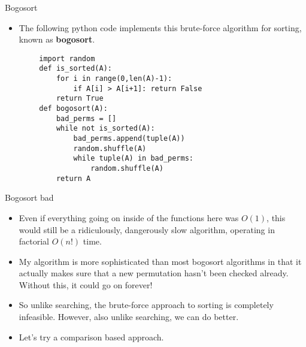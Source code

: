 \documentclass{beamer}
\begin{document}
\begin{frame}[fragile]{Bogosort}
    \begin{itemize}
        \item The following python code implements this brute-force algorithm for sorting, known as \textbf{bogosort}. 
    \end{itemize}
    \begin{verbatim}
        import random
        def is_sorted(A):
	        for i in range(0,len(A)-1):
		        if A[i] > A[i+1]: return False
	        return True
        def bogosort(A):
	        bad_perms = []
	        while not is_sorted(A):
		        bad_perms.append(tuple(A))
		        random.shuffle(A)
		        while tuple(A) in bad_perms:
			        random.shuffle(A)
	        return A
    \end{verbatim}
\end{frame}

\begin{frame}{Bogosort bad}
    \begin{itemize}
        \item Even if everything going on inside of the functions here was $O(1)$, this would still be a ridiculously, dangerously slow algorithm, operating in factorial $O(n!)$ time. 
        \item My algorithm is more sophisticated than most bogosort algorithms in that it actually makes sure that a new permutation hasn't been checked already. Without this, it could go on forever!
        \item So unlike searching, the brute-force approach to sorting is completely infeasible. However, also unlike searching, we can do better. 
        \item Let's try a comparison based approach.
    \end{itemize}
\end{frame}
\end{document}
